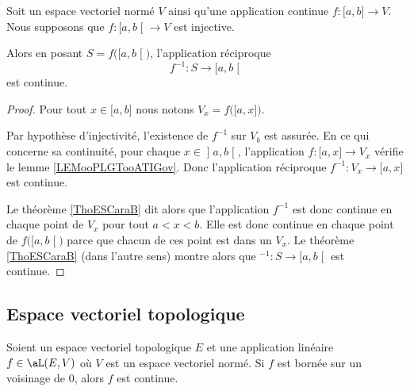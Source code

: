 \begin{lemma}        \label{LEMooKSDKooDbKKeB}
	Soit un espace vectoriel normé \( V\) ainsi qu'une application continue \( f\colon \mathopen[ a , b \mathclose]\to V\). Nous supposons que \( f\colon \mathopen[ a , b \mathclose[\to V\) est injective.

	Alors en posant \( S=f\big( \mathopen[ a , b \mathclose[ \big)\), l'application réciproque
	\begin{equation}
		f^{-1}\colon S\to \mathopen[ a , b \mathclose[
	\end{equation}
	est continue.
\end{lemma}

\begin{proof}
	Pour tout \( x\in \mathopen[ a , b \mathclose]\) nous notons \( V_x=f\big( \mathopen[ a , x \mathclose] \big)\).

	Par hypothèse d'injectivité, l'existence de \( f^{-1}\) sur \( V_b\) est assurée. En ce qui concerne sa continuité, pour chaque \( x\in\mathopen] a , b \mathclose[\), l'application \( f\colon \mathopen[ a , x \mathclose]\to V_x\) vérifie le lemme \ref{LEMooPLGTooATIGov}. Donc l'application réciproque \( f^{-1}\colon V_x\to \mathopen[ a , x \mathclose]\) est continue.

	Le théorème \ref{ThoESCaraB} dit alors que l'application \( f^{-1}\) est donc continue en chaque point de \( V_x \) pour tout \( a<x<b\). Elle est donc continue en chaque point de \( f\big( \mathopen[ a , b \mathclose[ \big)\) parce que chacun de ces point est dans un \( V_x\). Le théorème \ref{ThoESCaraB}  (dans l'autre sens) montre alors que \( ^{-1}\colon S\to \mathopen[ a , b \mathclose[\) est continue.
\end{proof}


\subsection{Espace vectoriel topologique}

\begin{proposition}	\label{PROPooHUWQooPWYBUu}
	Soient un espace vectoriel topologique \( E\) et une application linéaire \( f\in\aL(E,V)\) où \( V\) est un espace vectoriel normé. Si \( f\) est bornée sur un voisinage de \( 0\), alors \( f\) est continue.
\end{proposition}

